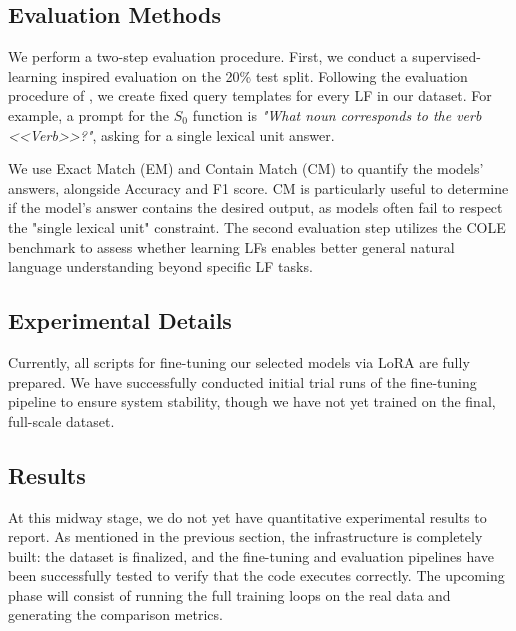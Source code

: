 \documentclass[11pt]{article}
\begin{document}
\subsection{Evaluation Methods}
We perform a two-step evaluation procedure. First, we conduct a supervised-learning inspired evaluation on the 20\% test split. Following the evaluation procedure of \citet{petrovQALFFrenchQuestionAnswering2025}, we create fixed query templates for every LF in our dataset. For example, a prompt for the $S_0$ function is \textit{"What noun corresponds to the verb <<Verb>>?"}, asking for a single lexical unit answer. 

We use Exact Match (EM) and Contain Match (CM) \citep{petrovQALFFrenchQuestionAnswering2025} to quantify the models' answers, alongside Accuracy and F1 score. CM is particularly useful to determine if the model's answer contains the desired output, as models often fail to respect the "single lexical unit" constraint. The second evaluation step utilizes the COLE benchmark \citep{beaucheminCOLEComprehensiveBenchmark2025} to assess whether learning LFs enables better general natural language understanding beyond specific LF tasks.

\subsection{Experimental Details}
Currently, all scripts for fine-tuning our selected models via LoRA are fully prepared. We have successfully conducted initial trial runs of the fine-tuning pipeline to ensure system stability, though we have not yet trained on the final, full-scale dataset.

\subsection{Results}
At this midway stage, we do not yet have quantitative experimental results to report. As mentioned in the previous section, the infrastructure is completely built: the dataset is finalized, and the fine-tuning and evaluation pipelines have been successfully tested to verify that the code executes correctly. The upcoming phase will consist of running the full training loops on the real data and generating the comparison metrics.
\end{document}
